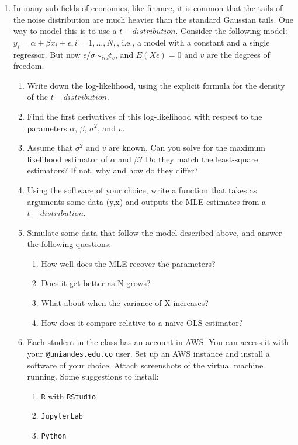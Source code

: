 \documentclass[12pt,onecolumn]{article}
\begin{document}
\begin{enumerate}
\item In many sub-fields of economics, like finance, it is common that the tails of the noise distribution are much heavier than the standard Gaussian tails. One way to model this is to use a $t-distribution$. Consider the following model: $y_i = \alpha +\beta x_i +\epsilon, i=1,...,N,$, i.e., a model with a constant and a single regressor. But now $\epsilon / \sigma \sim_{iid} t_v$, and $E(X\epsilon)=0$ and $v$ are the degrees of freedom.
  \begin{enumerate}
    \item Write down the log-likelihood, using the explicit formula for the density of the $t-distribution$.
    \item Find the first derivatives of this log-likelihood with respect to the parameters $\alpha$, $\beta$, $\sigma^2$, and $v$.
    \item Assume that $\sigma^2$ and $v$ are known. Can you solve for the maximum likelihood estimator of $\alpha$ and $\beta$? Do they match the least-square estimators? If not, why and how do they differ?
    \item Using the software of your choice, write a function that takes as arguments some data (y,x) and outputs the MLE estimates from a $t-distribution$.
    \item Simulate some data that follow the model described above, and answer the following questions:
    \begin{enumerate}
      \item How well does the MLE recover the parameters?
      \item Does it get better as N grows?
      \item What about when the variance of X increases?
      \item How does it compare relative to a naive OLS estimator?
    \end{enumerate}


\item Each student in the class has an account in AWS. You can access it with your \texttt{@uniandes.edu.co} user. Set up an AWS instance and install a software of your choice. Attach screenshots of the virtual machine running. Some suggestions to install:
  \begin{enumerate}
    \item \texttt{R} with \texttt{RStudio}
    \item \texttt{JupyterLab}
    \item \texttt{Python}
  \end{enumerate}
  

\end{enumerate}
\end{enumerate}
\end{document}
